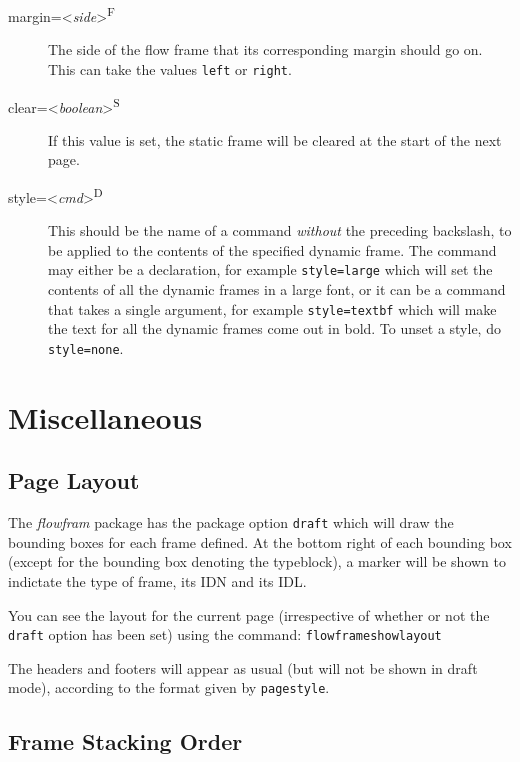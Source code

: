 \documentclass[a4paper]{report}
\providecommand{\cmdname}[1]{\texttt{\symbol{92}#1}}
\providecommand{\meta}[1]{\textnormal{\textless\textit{#1}\textgreater}}
\begin{document}
\begin{description}
\item[margin=\meta{side}\textsuperscript{F}]\mbox{}\par The side of
the flow frame that its corresponding margin should go on. This
can take the values \texttt{left} or \texttt{right}.

\item[clear=\meta{boolean}\textsuperscript{S}] If this value
is set, the static frame will be cleared at the start of the
next page.

\item[style=\meta{cmd}\textsuperscript{D}]\mbox{}\par This should be
the name of a command \emph{without} the preceding backslash, 
to be applied to the contents of the specified dynamic frame. 
The command may either be a declaration, for example \verb/style=large/
which will set the contents of all the dynamic frames in a
large font, or it can be a command that takes a single argument,
for example \verb/style=textbf/
which will make the text for all the dynamic frames come out in 
bold.  To unset a style, do \verb/style=none/.

\end{description}

\chapter{Miscellaneous}

\section*{Page Layout}

The \textsl{flowfram} package has the package option \texttt{draft}
which will draw the {bounding boxes} for
each frame defined.  At the bottom right of each
bounding box (except for the bounding box denoting the 
typeblock), a marker will be shown to indictate the type
of frame, its IDN and its IDL.

You can see the layout for the current page (irrespective of
whether or not the \texttt{draft} option has been set) using
the command:\newline 
\cmdname{flowframeshowlayout}

The headers and footers will appear as usual (but will not
be shown in draft mode), according to the format given by 
\cmdname{pagestyle}.

\section*{Frame Stacking Order}
\end{document}
